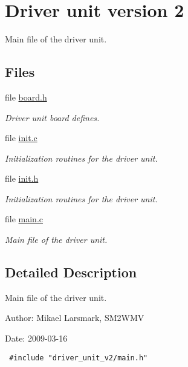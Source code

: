 \hypertarget{group__driver__unit__v2__group}{
\section{Driver unit version 2}
\label{group__driver__unit__v2__group}
}
Main file of the driver unit.  


\subsection*{Files}
\begin{CompactItemize}
\item 
file \hyperlink{driver__unit__v2_2board_8h}{board.h}
\begin{CompactList}\small\item\em Driver unit board defines. \item\end{CompactList}

\item 
file \hyperlink{driver__unit__v2_2init_8c}{init.c}
\begin{CompactList}\small\item\em Initialization routines for the driver unit. \item\end{CompactList}

\item 
file \hyperlink{driver__unit__v2_2init_8h}{init.h}
\begin{CompactList}\small\item\em Initialization routines for the driver unit. \item\end{CompactList}

\item 
file \hyperlink{driver__unit__v2_2main_8c}{main.c}
\begin{CompactList}\small\item\em Main file of the driver unit. \item\end{CompactList}

\end{CompactItemize}


\subsection{Detailed Description}
Main file of the driver unit. 

\begin{Desc}
\item[Author:]Mikael Larsmark, SM2WMV \end{Desc}
\begin{Desc}
\item[Date:]2009-03-16 

\begin{Code}\begin{verbatim} #include "driver_unit_v2/main.h" 
\end{verbatim}
\end{Code}

 \end{Desc}
